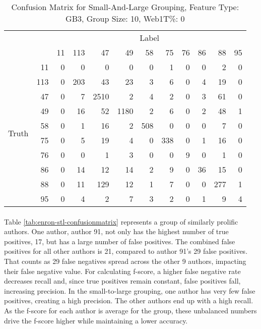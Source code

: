 	\begin{table}[htbp!]
	\begin{center}
			\begin{tabular}{ | c | r | r | r | r | r | r | r | r | r| r | r |}
			\cline{3-12}
			\multicolumn{2}{c}{} & \multicolumn{10}{|c|}{Label}\\ \cline{3-12}
			\multicolumn{2}{c|}{} & 11 & 113 & 47 & 49 & 58 & 75 & 76 & 86 & 88 & 95\\ \hline 
			\multirow{10}{*}{\begin{sideways}Truth\end{sideways}}& 11 & 0 & 0 & 0 & 0 & 0 & 1 & 0 & 0 & 2 & 0\\ \cline{2-12} 
			& 113 & 0 & 203 & 43 & 23 & 3 & 6 & 0 & 4 & 19 & 0\\ \cline{2-12} 
			& 47 & 0 & 7 & 2510 & 2 & 4 & 2 & 0 & 3 & 61 & 0\\ \cline{2-12}
			& 49 & 0 & 16 & 52 & 1180 & 2 & 6 & 0 & 2 & 48 & 1\\ \cline{2-12} 
			& 58 & 0 & 1 & 16 & 2 & 508 & 0 & 0 & 0 & 7 & 0\\ \cline{2-12} 
			& 75 & 0 & 5 & 19 & 4 & 0 & 338 & 0 & 1 & 16 & 0\\ \cline{2-12} 
			& 76 & 0 & 0 & 1 & 3 & 0 & 0 & 9 & 0 & 1 & 0\\ \cline{2-12} 
			& 86 & 0 & 14 & 12 & 14 & 2 & 9 & 0 & 36 & 15 & 0\\ \cline{2-12} 
			& 88 & 0 & 11 & 129 & 12 & 1 & 7 & 0 & 0 & 277 & 1\\ \cline{2-12} 
			& 95 & 0 & 4 & 2 & 7 & 3 & 2 & 0 & 1 & 9 & 4\\ \hline
	\end{tabular}
		\caption{Confusion Matrix for Small-And-Large Grouping, Feature Type: GB3, Group Size: 10, Web1T\%: 0}
		\label{tab:enron-sal-confusionmatrix}
		\end{center}	
	\end{table}
	
	\paragraph*{} Table \ref{tab:enron-stl-confusionmatrix} represents a group of similarly prolific authors.  One author, author 91, not only has the highest number of true positives, 17, but has a large number of false positives.  The combined false positives for all other authors is 21, compared to author 91's 29 false positives.  That counts as 29 false negatives spread across the other 9 authors, impacting their false negative value.  For calculating f-score, a higher false negative rate decreases recall and, since true positives remain constant, false positives fall, increasing precision.  In the small-to-large grouping, one author has very few false positives, creating a high precision.  The other authors end up with a high recall.  As the f-score for each author is average for the group, these unbalanced numbers drive the f-score higher while maintaining a lower accuracy.
